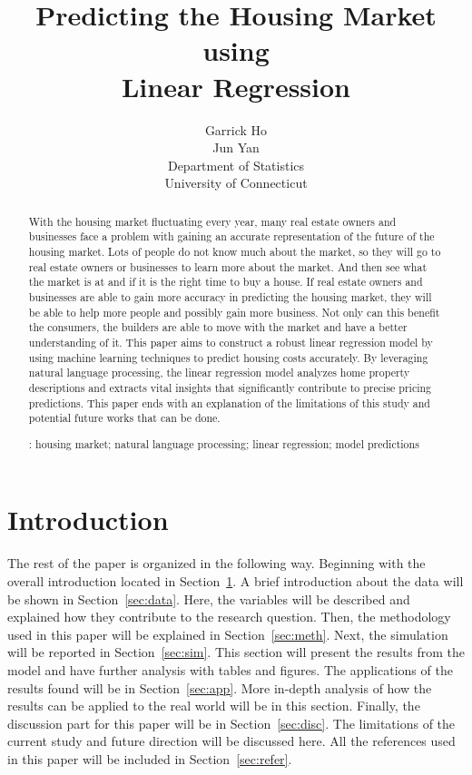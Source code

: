 \documentclass[12pt]{article}
\title{Predicting the Housing Market using \\ Linear Regression}
\author{Garrick Ho\\
  Jun Yan\\[2ex]
  Department of Statistics\\
  University of Connecticut\\
}
\begin{document}
\maketitle
\doublespace

\begin{abstract}
With the housing market fluctuating every year, many real estate owners and businesses face a problem with gaining an accurate representation of the future of the housing market. Lots of people do not know much about the market, so they will go to real estate owners or businesses to learn more about the market. And then see what the market is at and if it is the right time to buy a house. If real estate owners and businesses are able to gain more accuracy in predicting the housing market, they will be able to help more people and possibly gain more business. Not only can this benefit the consumers, the builders are able to move with the market and have a better understanding of it. This paper aims to construct a robust linear regression model by using machine learning techniques to predict housing costs accurately. By leveraging natural language processing, the linear regression model analyzes home property descriptions and extracts vital insights that significantly contribute to precise pricing predictions. This paper ends with an explanation of the limitations of this study and potential future works that can be done.

\bigskip
{}:
housing market;
natural language processing;
linear regression;
model predictions


\end{abstract}

\section{Introduction}
\label{sec:intro}



The rest of the paper is organized in the following way.
Beginning with the overall introduction located in Section~\ref{sec:intro}.
A brief introduction about the data will be shown in Section~\ref{sec:data}. Here, the variables will be described and explained how they contribute to the research question.
Then, the methodology used in this paper will be explained in Section~\ref{sec:meth}.
Next, the simulation will be reported in Section~\ref{sec:sim}. This section will present the results from the model and have further analysis with tables and figures.
The applications of the results found will be in Section~\ref{sec:app}. More in-depth analysis of how the results can be applied to the real world will be in this section.
Finally, the discussion part for this paper will be in Section~\ref{sec:disc}. The limitations of the current study and future direction will be discussed here.
All the references used in this paper will be included in Section~\ref{sec:refer}.
\end{document}
